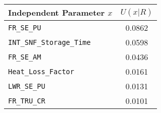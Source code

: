 \begin{center}
\begin{tabular}{|l|c|}
\hline
\textbf{Independent Parameter $x$}&\textbf{$U(x|R)$}\\
\hline
\texttt{FR\_SE\_PU}             &0.0862\\
\hline
\texttt{INT\_SNF\_Storage\_Time}&0.0598\\
\hline
\texttt{FR\_SE\_AM}             &0.0436\\
\hline
\texttt{Heat\_Loss\_Factor}     &0.0161\\
\hline
\texttt{LWR\_SE\_PU}            &0.0131\\
\hline
\texttt{FR\_TRU\_CR}            &0.0101\\
\hline
\end{tabular}
\end{center}
